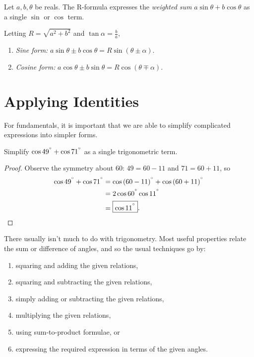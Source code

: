 \documentclass[../jarvis.tex]{subfiles}
\begin{document}
\begin{proposition}
    Let $a,b,\theta$ be reals. The R-formula expresses the \textit{weighted sum} $a\sin\theta+b\cos\theta$ as a single $\sin$ or $\cos$ term.

    Letting $R=\sqrt{a^2+b^2}$ and $\tan\alpha=\frac{b}{a}$,
    \begin{enumerate}
        \item \textit{Sine form:} $a\sin\theta\pm b\cos\theta=R\sin(\theta\pm\alpha).$
        \item \textit{Cosine form:} $a\cos\theta\pm b\sin\theta=R\cos(\theta\mp\alpha).$
    \end{enumerate}
\end{proposition}
\section{Applying Identities \ez}
For fundamentals, it is important that we are able to simplify complicated expressions into simpler forms.
\begin{example}
    Simplify $\cos{49^{^\circ}}+\cos{71^{^\circ}}$ as a single trigonometric term.
\end{example}
\begin{proof}
    Observe the symmetry about $60$: $49=60-11$ and $71=60+11$, so
    \begin{align*}
        \cos{49^{^\circ}}+\cos{71^{^\circ}}&=\cos{(60-11)^{^\circ}}+\cos{(60+11)^{^\circ}} \\
        &=2\cos{60^{^\circ}}\cos{11^{^\circ}} \\
        &=\boxed{\cos{11^{^\circ}}}.
    \end{align*}
\end{proof}

\begin{proposition}[Toolkit]
    There usually isn't much to do with trigonometry. Most useful properties relate the sum or difference of angles, and so the usual techniques go by:
    \begin{enumerate}
        \item squaring and adding the given relations,
        \item squaring and subtracting the given relations,
        \item simply adding or subtracting the given relations,
        \item multiplying the given relations, 
        \item using sum-to-product formulae, or
        \item expressing the required expression in terms of the given angles.
    \end{enumerate}
\end{proposition}
\end{document}
